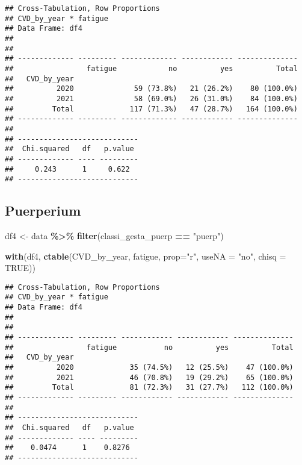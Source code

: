 \documentclass[
]{article}
\newenvironment{Shaded}{\begin{snugshade}}{\end{snugshade}}
\newcommand{\AttributeTok}[1]{\textcolor[rgb]{0.13,0.29,0.53}{#1}}
\newcommand{\ConstantTok}[1]{\textcolor[rgb]{0.56,0.35,0.01}{#1}}
\newcommand{\FunctionTok}[1]{\textcolor[rgb]{0.13,0.29,0.53}{\textbf{#1}}}
\newcommand{\NormalTok}[1]{#1}
\newcommand{\OtherTok}[1]{\textcolor[rgb]{0.56,0.35,0.01}{#1}}
\newcommand{\SpecialCharTok}[1]{\textcolor[rgb]{0.81,0.36,0.00}{\textbf{#1}}}
\newcommand{\StringTok}[1]{\textcolor[rgb]{0.31,0.60,0.02}{#1}}
\begin{document}
\begin{verbatim}
## Cross-Tabulation, Row Proportions  
## CVD_by_year * fatigue  
## Data Frame: df4  
## 
## 
## ------------- --------- ------------- ------------ --------------
##                 fatigue            no          yes          Total
##   CVD_by_year                                                    
##          2020              59 (73.8%)   21 (26.2%)    80 (100.0%)
##          2021              58 (69.0%)   26 (31.0%)    84 (100.0%)
##         Total             117 (71.3%)   47 (28.7%)   164 (100.0%)
## ------------- --------- ------------- ------------ --------------
## 
## ----------------------------
##  Chi.squared   df   p.value 
## ------------- ---- ---------
##     0.243      1     0.622  
## ----------------------------
\end{verbatim}

\hypertarget{puerperium-3}{%
\subsection{Puerperium}\label{puerperium-3}}

\begin{Shaded}
\begin{Highlighting}[]
\NormalTok{df4 }\OtherTok{\textless{}{-}}\NormalTok{ data }\SpecialCharTok{\%\textgreater{}\%} 
  \FunctionTok{filter}\NormalTok{(classi\_gesta\_puerp }\SpecialCharTok{==} \StringTok{"puerp"}\NormalTok{)}

\FunctionTok{with}\NormalTok{(df4, }\FunctionTok{ctable}\NormalTok{(CVD\_by\_year, fatigue, }\AttributeTok{prop=}\StringTok{"r"}\NormalTok{, }\AttributeTok{useNA =} \StringTok{"no"}\NormalTok{, }\AttributeTok{chisq =} \ConstantTok{TRUE}\NormalTok{))}
\end{Highlighting}
\end{Shaded}

\begin{verbatim}
## Cross-Tabulation, Row Proportions  
## CVD_by_year * fatigue  
## Data Frame: df4  
## 
## 
## ------------- --------- ------------ ------------ --------------
##                 fatigue           no          yes          Total
##   CVD_by_year                                                   
##          2020             35 (74.5%)   12 (25.5%)    47 (100.0%)
##          2021             46 (70.8%)   19 (29.2%)    65 (100.0%)
##         Total             81 (72.3%)   31 (27.7%)   112 (100.0%)
## ------------- --------- ------------ ------------ --------------
## 
## ----------------------------
##  Chi.squared   df   p.value 
## ------------- ---- ---------
##    0.0474      1    0.8276  
## ----------------------------
\end{verbatim}
\end{document}
